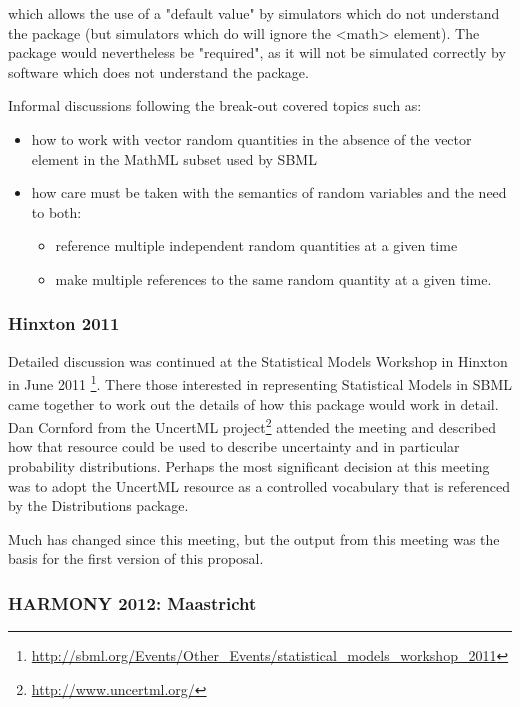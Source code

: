 \documentclass[draftspec]{sbmlpkgspec}
\newcommand{\distrib}{Distributions\xspace}
\newcommand{\uncertml}{UncertML\xspace}
\begin{document}
which allows the use of a "default value" by simulators which do not
understand the package (but simulators which do will ignore the <math>
element). The package would nevertheless be "required", as it will not
be simulated correctly by software which does not understand the
package.

Informal discussions following the break-out covered topics such as:

\begin{itemize}
\item how to work with vector random quantities in the absence of the vector
element in the MathML subset used by SBML
\item how care must be taken with the semantics of random variables
  and the need to both:
\begin{itemize}
\item reference multiple independent random quantities at a given
  time
\item make multiple references to the same random quantity at a given
time.
\end{itemize}
\end{itemize}

\subsubsection{Hinxton 2011}

Detailed discussion was continued at the Statistical Models Workshop
in Hinxton in June 2011%
\footnote{\url{http://sbml.org/Events/Other_Events/statistical_models_workshop_2011}}. There
those interested in representing Statistical Models in SBML came
together to work out the details of how this package would work in
detail. Dan Cornford from the \uncertml
project\footnote{\url{http://www.uncertml.org/}} attended the meeting
and described how that resource could be used to describe uncertainty
and in particular probability distributions. Perhaps the most
significant decision at this meeting was to adopt the \uncertml
resource as a controlled vocabulary that is referenced by the \distrib package.

Much has changed since this meeting, but the output from this meeting
was the basis for the first version of this proposal.


\subsubsection{HARMONY 2012: Maastricht}
\end{document}
